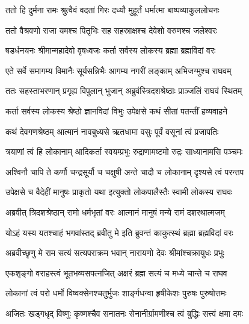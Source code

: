 

\twolineshloka
{ततो हि दुर्मना रामः श्रुत्वैवं वदतां गिरः}
{दध्यौ मुहूर्तं धर्मात्मा बाष्पव्याकुललोचनः}%


\twolineshloka
{ततो वैश्रवणो राजा यमश्च पितृभिः सह}
{सहस्राक्षश्च देवेशो वरुणश्च जलेश्वरः}%


\twolineshloka
{षडर्धनयनः श्रीमान्महादेवो वृषध्वजः}
{कर्ता सर्वस्य लोकस्य ब्रह्मा ब्रह्मविदां वरः}%


\twolineshloka
{एते सर्वे समागम्य विमानैः सूर्यसन्निभैः}
{आगम्य नगरीं लङ्काम् अभिजग्मुश्च राघवम्}%


\twolineshloka
{ततः सहस्ताभरणान् प्रगृह्य विपुलान् भुजान्}
{अब्रुवंस्त्रिदशश्रेष्ठाः प्राञ्जलिं राघवं स्थितम्}%


\twolineshloka
{कर्ता सर्वस्य लोकस्य श्रेष्ठो ज्ञानविदां विभुः}
{उपेक्षसे कथं सीतां पतन्तीं हव्यवाहने}%


\twolineshloka
{कथं देवगणश्रेष्ठम् आत्मानं नावबुध्यसे}
{ऋतधामा वसुः पूर्वं वसूनां त्वं प्रजापतिः}%


\twolineshloka
{त्रयाणां त्वं हि लोकानाम् आदिकर्ता स्वयम्प्रभुः}
{रुद्राणामष्टमो रुद्रः साध्यानामसि पञ्चमः}%


\twolineshloka
{अश्विनौ चापि ते कर्णौ चन्द्रसूर्यौ च चक्षुषी}
{अन्ते चादौ च लोकानाम् दृश्यसे त्वं परन्तप}%


\twolineshloka
{उपेक्षसे च वैदेहीं मानुषः प्राकृतो यथा}
{इत्युक्तो लोकपालैस्तैः स्वामी लोकस्य राघवः}%


\twolineshloka
{अब्रवीत् त्रिदशश्रेष्ठान् रामो धर्मभृतां वरः}
{आत्मानं मानुषं मन्ये रामं दशरथात्मजम्}%


\twolineshloka
{योऽहं यस्य यतश्चाहं भगवांस्तद् ब्रवीतु मे}
{इति ब्रुवन्तं काकुत्स्थं ब्रह्मा ब्रह्मविदां वरः}%


\twolineshloka
{अब्रवीच्छृणु मे राम सत्यं सत्यपराक्रम}
{भवान् नारायणो देवः श्रीमांश्चक्रायुधः प्रभुः}%


\twolineshloka
{एकशृङ्गो वराहस्त्वं भूतभव्यसपत्नजित्}
{अक्षरं ब्रह्म सत्यं च मध्ये चान्ते च राघव}%


\twolineshloka
{लोकानां त्वं परो धर्मो विष्वक्सेनश्चतुर्भुजः}
{शार्ङ्गधन्वा हृषीकेशः पुरुषः पुरुषोत्तमः}%


\twolineshloka
{अजितः खड्गधृद् विष्णुः कृष्णश्चैव सनातनः}
{सेनानीर्ग्रामणीश्च त्वं बुद्धिः सत्त्वं क्षमा दमः}%


